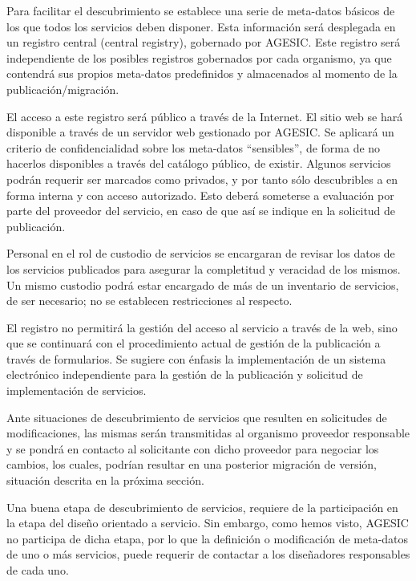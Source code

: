 \documentclass[11pt]{article}
\begin{document}
				Para facilitar el descubrimiento se establece una serie de meta-datos básicos de los que todos los servicios deben disponer. Esta información será desplegada en un registro central (central registry), gobernado por AGESIC. Este registro será independiente de los posibles registros gobernados por cada organismo, ya que contendrá sus propios meta-datos predefinidos y almacenados al momento de la publicación/migración.

				El acceso a este registro será público a través de la Internet. El sitio web se hará disponible a través de un servidor web gestionado por AGESIC. Se aplicará un criterio de confidencialidad sobre los meta-datos “sensibles”, de forma de no hacerlos disponibles a través del catálogo público, de existir.
				Algunos servicios podrán requerir ser marcados como privados, y por tanto sólo descubribles a en forma interna y con acceso autorizado. Esto deberá someterse a evaluación por parte del proveedor del servicio, en caso de que así se indique en la solicitud de publicación.

				Personal en el rol de custodio de servicios se encargaran de revisar los datos de los servicios publicados para asegurar la completitud y veracidad de los mismos. Un mismo custodio podrá estar encargado de más de un inventario de servicios, de ser necesario; no se establecen restricciones al respecto.

				El registro no permitirá la gestión del acceso al servicio a través de la web, sino que se continuará con el procedimiento actual de gestión de la publicación a través de formularios. Se sugiere con énfasis la implementación de un sistema electrónico independiente para la gestión de la publicación y solicitud de implementación de servicios.

				Ante situaciones de descubrimiento de servicios que resulten en solicitudes de modificaciones, las mismas serán transmitidas al organismo proveedor responsable y se pondrá en contacto al solicitante con dicho proveedor para negociar los cambios, los cuales, podrían resultar en una posterior migración de versión, situación descrita en la próxima sección.

				Una buena etapa de descubrimiento de servicios, requiere de la participación en la etapa del diseño orientado a servicio. Sin embargo, como hemos visto, AGESIC no participa de dicha etapa, por lo que la definición o modificación de meta-datos de uno o más servicios, puede requerir de contactar a los diseñadores responsables de cada uno.
\end{document}
